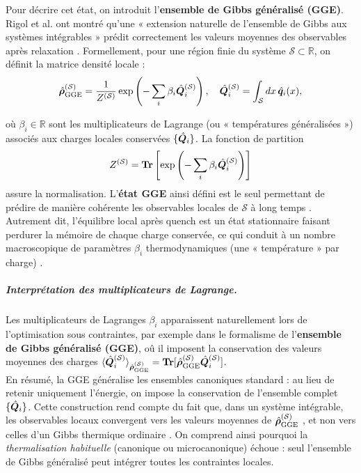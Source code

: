 Pour décrire cet état, on introduit l’{\bf ensemble de Gibbs généralisé (GGE)}. Rigol et al. ont montré qu’une « extension naturelle de l’ensemble de Gibbs aux systèmes intégrables » prédit correctement les valeurs moyennes des observables après relaxation \cite{??}.  Formellement, pour une région finie du système $\mathcal{S} \subset \mathbb{R}$, on définit la matrice densité locale :
\begin{eqnarray}
	\hat{\bm{\rho}}^{(\mathcal{S})}_{\mathrm{GGE}} = \frac{1}{Z^{(\mathcal{S})}}\exp \left ( - \sum_i \beta_i \hat{\bm{Q}}_i^{(\mathcal{S})} \right), \quad \hat{\bm{Q}}_i^{(\mathcal{S})} = \int_\mathcal{S} dx \, \hat{\bm{q}}_i(x), \label{chap.TBA.op.rho.S}	
\end{eqnarray}

où $\beta_i \in \mathbb{R}$ sont les multiplicateurs de Lagrange (ou « températures généralisées ») associés aux charges locales conservées $\{\hat{\bm{Q}}_i\}$. La fonction de partition 
\begin{eqnarray}
	Z^{(\mathcal{S})} = \bm{\mathrm{Tr}}\left [\exp \left( - \sum_i \beta_i \hat{\bm{Q}}_i^{(\mathcal{S})} \right ) \right ]  \label{chap.TBA.op.Z.S}	
\end{eqnarray}
 assure la normalisation. L’{\bf état GGE} ainsi défini est le seul permettant de prédire de manière cohérente les observables locales de $\mathcal{S}$ à long temps \cite{??}. Autrement dit, l’équilibre local après quench est un état stationnaire faisant perdurer la mémoire de chaque charge conservée, ce qui conduit à un nombre macroscopique de paramètres $\beta_i$ thermodynamiques (une « température » par charge) \cite{??}.

 \subparagraph{Interprétation des multiplicateurs de Lagrange.}
Les multiplicateurs de Lagranges $\beta_i$ apparaissent naturellement lors de l'optimisation sous contraintes, par exemple dans le formalisme de l'{\bf ensemble de Gibbs généralisé (GGE)}, oû il imposent la conservation des valeurs moyennes des charges $\langle \hat{\bm{Q}}_i^{(\mathcal{S})} \rangle_{\hat{\bm{\rho}}^{(\mathcal{S})}_{\mathrm{GGE}}} = \bm{\mathrm{Tr}}[\hat{\bm{\rho}}^{(\mathcal{S})}_{\mathrm{GGE}} \hat{\bm{Q}}_i^{(\mathcal{S})}]   $.\\

En résumé, la GGE généralise les ensembles canoniques standard : au lieu de retenir uniquement l’énergie, on impose la conservation de l’ensemble complet $\{\hat{\bm{Q}}_i \}$. Cette construction rend compte du fait que, dans un système intégrable, les observables locaux convergent vers les valeurs moyennes de $\hat{\bm{\rho}}^{(\mathcal{S})}_{\mathrm{GGE}}$ , et non vers celles d’un Gibbs thermique ordinaire \cite{??}\cite{??}. On comprend ainsi pourquoi la {\em thermalisation habituelle} (canonique ou microcanonique) échoue : seul l’ensemble de Gibbs généralisé peut intégrer toutes les contraintes locales.

